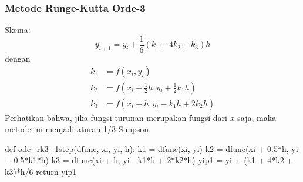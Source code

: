 \begin{frame}[fragile]
\frametitle{Metode Runge-Kutta Orde-3}

Skema:
\begin{equation*}
y_{i+1} = y_i + \frac{1}{6}(k_1 + 4k_2 + k_3)h
\end{equation*}
dengan
\begin{align*}
k_1 & = f(x_i, y_i) \\
k_2 & = f(x_i + \frac{1}{2}h, y_i + \frac{1}{2} k_1 h ) \\
k_3 & = f(x_i + h, y_i - k_1 h + 2 k_2 h)
\end{align*}
Perhatikan bahwa, jika fungsi turunan merupakan fungsi dari $x$ saja, maka metode ini menjadi
aturan 1/3 Simpson.

\begin{pythoncode}
def ode_rk3_1step(dfunc, xi, yi, h):
    k1 = dfunc(xi, yi)
    k2 = dfunc(xi + 0.5*h, yi + 0.5*k1*h)
    k3 = dfunc(xi + h, yi - k1*h + 2*k2*h)
    yip1 = yi + (k1 + 4*k2 + k3)*h/6
    return yip1
\end{pythoncode}

\end{frame}








